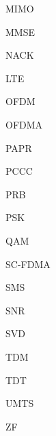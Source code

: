 \begin{enumerate}
\begin{minipage}{0.7\linewidth}
    
  	\end{minipage}
\end{enumerate}
	 
\begin{enumerate}
	\begin{minipage}{0.2\linewidth}  
    	\item[] MIMO
   	    \item[] MMSE
   	    \item[] NACK
        \item[] LTE
     	\item[] OFDM
        \item[] OFDMA
        \item[] PAPR
        \item[] PCCC
        \item[] PRB
        \item[] PSK
        \item[] QAM
        \item[] SC-FDMA
        \item[] SMS
        \item[] SNR
        \item[] SVD
        \item[] TDM
        \item[] TDT
        \item[] UMTS
        \item[] ZF 
     \end{minipage}
     \begin{minipage}{0.7\linewidth}
     

\end{minipage}
\end{enumerate}
